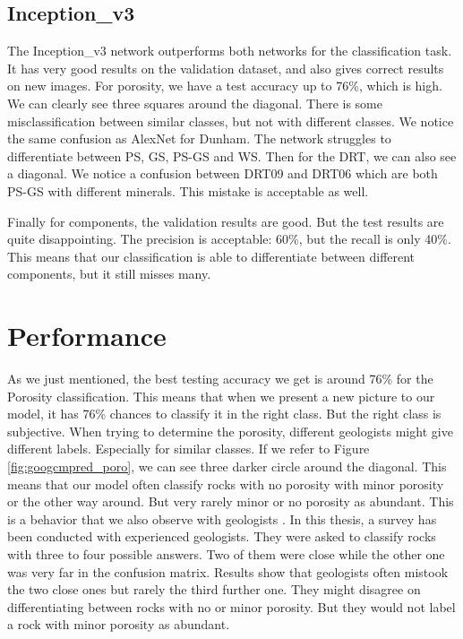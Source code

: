 \subsection{Inception\_v3}
The Inception\_v3 network outperforms both networks for the classification task. It has very good results on the validation dataset, and also gives correct results on new images. For porosity, we have a test accuracy up to 76\%, which is high. We can clearly see three squares around the diagonal. There is some misclassification between similar classes, but not with different classes. 
We notice the same confusion as AlexNet for Dunham. The network struggles to differentiate between PS, GS, PS-GS and WS. 
Then for the DRT, we can also see a diagonal. We notice a confusion between DRT09 and DRT06 which are both PS-GS with different minerals. This mistake is acceptable as well.

Finally for components, the validation results are good. But the test results are quite disappointing. The precision is acceptable: 60\%, but the recall is only 40\%. This means that our classification is able to differentiate between different components, but it still misses many.

\section{Performance} \label{sec:perf}

As we just mentioned, the best testing accuracy we get is around 76\% for the Porosity classification. This means that when we present a new picture to our model, it has 76\% chances to classify it in the right class. But the right class is subjective. When trying to determine the porosity, different geologists might give different labels. Especially for similar classes. If we refer to Figure \ref{fig:googcmpred_poro}, we can see three darker circle around the diagonal. This means that our model often classify rocks with no porosity with minor porosity or the other way around. But very rarely minor or no porosity as abundant. This is a behavior that we also observe with geologists \cite{thesis_imperial}. In this thesis, a survey has been conducted with experienced geologists. They were asked to classify rocks with three to four possible answers. Two of them were close while the other one was very far in the confusion matrix. Results show that geologists often mistook the two close ones but rarely the third further one. 
They might disagree on differentiating between rocks with no or minor porosity. But they would not label a rock with minor porosity as abundant. 

